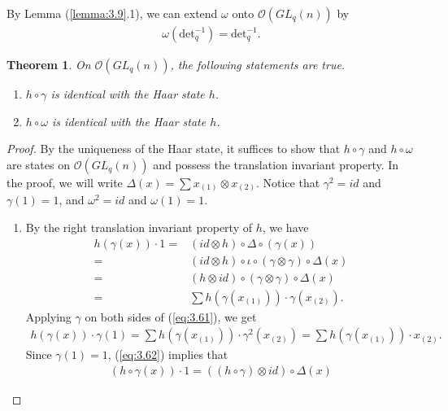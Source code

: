 \documentclass[table,a4paper,reqno]{amsart}
\numberwithin{equation}{section}
\newtheorem{theorem}{Theorem}[section]
\theoremstyle{definition}
\begin{document}
By Lemma (\ref{lemma:3.9}.1), we can extend $\omega$ onto $\mathcal{O}(GL_q(n))$ by 
\begin{align}
    \omega(\text{det}_q^{-1})=\text{det}_q^{-1}.
\end{align}
\begin{theorem}\label{thm:3.10}
    On $\mathcal{O}(GL_q(n))$, the following statements are true.
    \begin{enumerate}
        \item[1] $h\circ\gamma$ is identical with the Haar state $h$.
        \item[2] $h\circ\omega$ is identical with the Haar state $h$.
    \end{enumerate}
\end{theorem}
\begin{proof}
   By the uniqueness of the Haar state, it suffices to show that $h\circ\gamma$ and $h\circ\omega$ are states on $\mathcal{O}(GL_q(n))$ and possess the translation invariant property. In the proof, we will write $\Delta(x)=\sum x_{(1)}\otimes x_{(2)}$. Notice that $\gamma^2=id$ and $\gamma(1)=1$, and $\omega^2=id$ and $\omega(1)=1$.
    \begin{enumerate}
        \item[1] By the right translation invariant property of $h$, we have
        \begin{equation}\label{eq:3.61}
            \begin{split}
            h(\gamma(x))\cdot 1=&(id\otimes h)\circ\Delta\circ(\gamma(x))\\
            =&(id\otimes h)\circ\iota\circ(\gamma\otimes\gamma)\circ\Delta(x)\\
            =&(h\otimes id)\circ(\gamma\otimes\gamma)\circ\Delta(x)\\
            =&\sum h(\gamma(x_{(1)}))\cdot \gamma(x_{(2)}).
            \end{split}
        \end{equation}
        Applying $\gamma$ on both sides of (\ref{eq:3.61}), we get
        \begin{align}\label{eq:3.62}
            h(\gamma(x))\cdot \gamma(1)=\sum h(\gamma(x_{(1)}))\cdot \gamma^2(x_{(2)})=\sum h(\gamma(x_{(1)}))\cdot x_{(2)}.
        \end{align}
        Since $\gamma(1)=1$, (\ref{eq:3.62}) implies that
        \begin{align}
            (h\circ\gamma(x))\cdot 1=((h\circ\gamma)\otimes id)\circ\Delta(x)
        \end{align}

\end{enumerate}
\end{proof}
\end{document}

